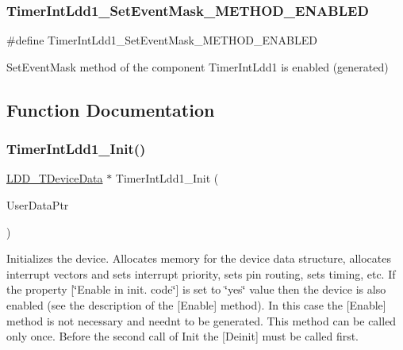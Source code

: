 \subsubsection{\texorpdfstring{Timer\+Int\+Ldd1\+\_\+\+Set\+Event\+Mask\+\_\+\+M\+E\+T\+H\+O\+D\+\_\+\+E\+N\+A\+B\+L\+ED}{TimerIntLdd1\_SetEventMask\_METHOD\_ENABLED}}
{\footnotesize\ttfamily \#define Timer\+Int\+Ldd1\+\_\+\+Set\+Event\+Mask\+\_\+\+M\+E\+T\+H\+O\+D\+\_\+\+E\+N\+A\+B\+L\+ED}

Set\+Event\+Mask method of the component Timer\+Int\+Ldd1 is enabled (generated) 

\subsection{Function Documentation}
\mbox{\label{group___timer_int_ldd1__module_ga069f7459fc74e21fb9bcceadbe7cb9cb}} 
\subsubsection{\texorpdfstring{Timer\+Int\+Ldd1\+\_\+\+Init()}{TimerIntLdd1\_Init()}}
{\footnotesize\ttfamily \hyperlink{group___p_e___types__module_gac5cf1362f1f0e3a2ce71b1bf2276d091}{L\+D\+D\+\_\+\+T\+Device\+Data} $\ast$ Timer\+Int\+Ldd1\+\_\+\+Init (\begin{DoxyParamCaption}\item[{\hyperlink{group___p_e___types__module_ga0b66a73f87238a782318aa0be7578e35}{L\+D\+D\+\_\+\+T\+User\+Data} $\ast$}]{User\+Data\+Ptr }\end{DoxyParamCaption})}



Initializes the device. Allocates memory for the device data structure, allocates interrupt vectors and sets interrupt priority, sets pin routing, sets timing, etc. If the property \mbox{[}\char`\"{}\+Enable in init. code\char`\"{}\mbox{]} is set to \char`\"{}yes\char`\"{} value then the device is also enabled (see the description of the \mbox{[}Enable\mbox{]} method). In this case the \mbox{[}Enable\mbox{]} method is not necessary and needn\textquotesingle{}t to be generated. This method can be called only once. Before the second call of Init the \mbox{[}Deinit\mbox{]} must be called first. 


